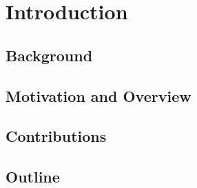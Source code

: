\chapter{Introduction}\label{sec-introduction}

\section{Background}

\section{Motivation and Overview}

\section{Contributions}

\section{Outline}

